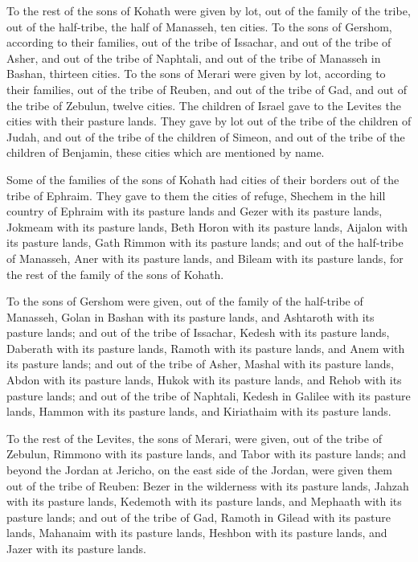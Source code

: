 \myverse{}To the rest of the sons of Kohath were given by lot, out of the
family of the tribe, out of the half-tribe, the half of Manasseh, ten cities.
\myverse{}To the sons of Gershom, according to their families, out of the tribe of Issachar,
and out of the tribe of Asher, and out of the tribe of Naphtali, and out of the tribe of Manasseh in Bashan,
thirteen cities.
\myverse{}To the sons of Merari were given by lot, according to their families, out
of the tribe of Reuben, and out of the tribe of Gad, and out of the tribe of Zebulun, twelve cities.
\myverse{}The children of Israel gave to the Levites the cities with their pasture lands.
\myverse{}They gave by lot out of the tribe of the children of Judah, and out of the
tribe of the children of Simeon, and out of the tribe of the children of Benjamin, these cities which
are mentioned by name.

\myverse{}Some of the families of the sons of Kohath had cities of their
borders out of the tribe of Ephraim.
\myverse{}They gave to them the cities of refuge, Shechem in the hill country of Ephraim
with its pasture lands and Gezer with its pasture lands,
\myverse{}Jokmeam with its pasture lands, Beth Horon with its pasture lands,
\myverse{}Aijalon with its pasture lands, Gath Rimmon with its pasture lands;
\myverse{}and out of the half-tribe of Manasseh, Aner with its pasture lands, and Bileam
with its pasture lands, for the rest of the family of the sons of Kohath.

\myverse{}To the sons of Gershom were given, out of the family of the half-tribe
of Manasseh, Golan in Bashan with its pasture lands, and Ashtaroth with its pasture lands;
\myverse{}and out of the tribe of Issachar, Kedesh with its pasture lands, Daberath
with its pasture lands,
\myverse{}Ramoth with its pasture lands, and Anem with its pasture lands;
\myverse{}and out of the tribe of Asher, Mashal with its pasture lands, Abdon with its
pasture lands,
\myverse{}Hukok with its pasture lands, and Rehob with its pasture lands;
\myverse{}and out of the tribe of Naphtali, Kedesh in Galilee with its pasture lands,
Hammon with its pasture lands, and Kiriathaim with its pasture lands.

\myverse{}To the rest of the Levites, the sons of Merari, were given, out
of the tribe of Zebulun, Rimmono with its pasture lands, and Tabor with its pasture lands;
\myverse{}and beyond the Jordan at Jericho, on the east side of the Jordan, were given
them out of the tribe of Reuben: Bezer in the wilderness with its pasture lands, Jahzah with its pasture
lands,
\myverse{}Kedemoth with its pasture lands, and Mephaath with its pasture lands;
\myverse{}and out of the tribe of Gad, Ramoth in Gilead with its pasture lands, Mahanaim
with its pasture lands,
\myverse{}Heshbon with its pasture lands, and Jazer with its pasture lands.



